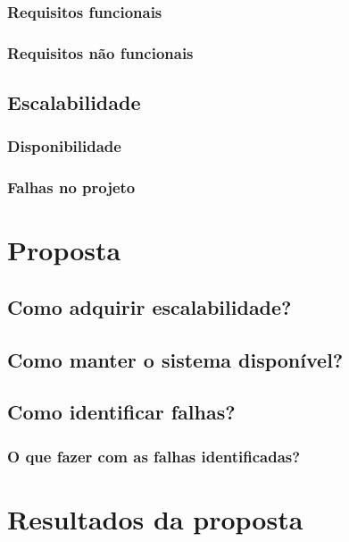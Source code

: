 \documentclass[]{../class/politex}
\begin{document}
      \subsection{Requisitos funcionais}

      \subsection{Requisitos não funcionais}

    \section{Escalabilidade}

      \subsection{Disponibilidade}

      \subsection{Falhas no projeto}

  \chapter{Proposta}

    \section{Como adquirir escalabilidade?}

    \section{Como manter o sistema disponível?}

    \section{Como identificar falhas?}

      \subsection{O que fazer com as falhas identificadas?}

  \chapter{Resultados da proposta}
\end{document}
